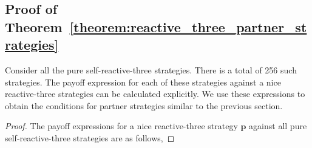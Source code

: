 \documentclass{article}
\theoremstyle{definition}
\begin{document}

\subsection{Proof of Theorem~\ref{theorem:reactive_three_partner_strategies}}\label{appendix:reactive_three_pure_self_reactive}

Consider all the pure self-reactive-three strategies. There is
a total of 256 such strategies. The payoff expression for each of
these strategies against a nice reactive-three strategies can be calculated
explicitly. We use these expressions to obtain the conditions for partner
strategies similar to the previous section.

\begin{proof}
The payoff expressions for a nice reactive-three strategy $\mathbf{p}$ against all
pure self-reactive-three strategies are as follows,


\end{proof}
\end{document}
